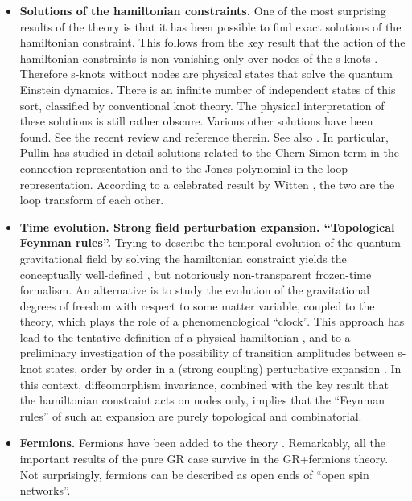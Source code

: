 \begin{itemize}

\item {\bf Solutions of the hamiltonian constraints.} One of 
the most surprising results of the theory is that it has been 
possible to find exact solutions of the hamiltonian constraint.  
This follows from the key result that the action of the 
hamiltonian constraints is non vanishing only over nodes of 
the s-knots \cite{RovelliSmolin88,RovelliSmolin90}.  Therefore 
s-knots without nodes are physical states that solve the 
quantum Einstein dynamics.  There is an infinite number of 
independent states of this sort, classified by conventional knot 
theory.  The physical interpretation of these solutions is still 
rather obscure.   Various other solutions have been found.  See 
the recent review \cite{Ezawa} and reference therein.  See also 
\cite{Husain,Kodama,Bruegmann2,H5,H4,H6,H7,GambiniPullin,Kauffman94b}. 
In particular, Pullin has 
studied in detail solutions related to the Chern-Simon term in 
the connection representation and to the Jones polynomial in the 
loop representation. According to a celebrated result by Witten 
\cite{Witten}, the two are the loop transform of each other. 

\item {\bf Time evolution.  Strong field perturbation expansion.  
``Topological Feynman rules''.  } Trying to describe the temporal 
evolution of the quantum gravitational field by solving the 
hamiltonian constraint yields the conceptually well-defined 
\cite{RovelliTime}, but notoriously non-transparent 
frozen-time formalism.  An alternative is to study the evolution 
of the gravitational degrees of freedom with respect to some 
matter variable, coupled to the theory, which plays the role of a 
phenomenological ``clock''.  This approach has lead to the 
tentative definition of a physical hamiltonian 
\cite{RovelliSmolin94b,H9}, 
and to a preliminary investigation of the possibility of 
transition amplitudes between s-knot states, order by order in a 
(strong coupling) perturbative expansion \cite{Rovelli95b}.  In 
this context, diffeomorphism invariance, combined with the key 
result that the hamiltonian constraint acts on nodes only, 
implies that the ``Feynman rules'' of such an expansion are purely 
topological and combinatorial.

\item {\bf Fermions.  } Fermions have been added to the theory 
\cite{MoralesRovelli,MoralesRovelli2,BaezKrasnov,ThiemannFermions}.  
Remarkably, all the 
important results of the pure GR case survive in the GR+fermions 
theory.  Not surprisingly, fermions can be described as open ends 
of ``open spin networks''.


\end{itemize}
